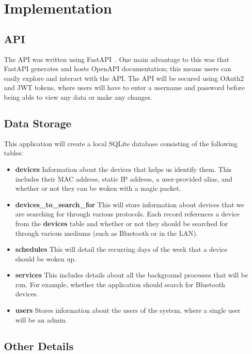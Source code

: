 
\section{Implementation}

\subsection{API}

The API was written using FastAPI~\cite{}. One main advantage to this was that FastAPI generates and hosts OpenAPI documentation; this means users can easily explore and interact with the API.
\x
The API will be secured using OAuth2 and JWT tokens, where users will have to enter a username and password before being able to view any data or make any changes.

\subsection{Data Storage}

This application will create a local SQLite database consisting of the following tables:

\begin{itemize}[noitemsep]
  \item \textbf{devices} Information about the devices that helps us identify them. This includes their MAC address, static IP address, a user-provided alias, and whether or not they can be woken with a magic packet.
  \item \textbf{devices\_to\_search\_for} This will store information about devices that we are searching for through various protocols. Each record references a device from the \textbf{devices} table and whether or not they should be searched for through various mediums (such as Bluetooth or in the LAN).
  \item \textbf{schedules} This will detail the recurring days of the week that a device should be woken up.
  \item \textbf{services} This includes details about all the background processes that will be run. For example, whether the application should search for Bluetooth devices.
  \item \textbf{users} Stores information about the users of the system, where a single user will be an admin.
\end{itemize}

\subsection{Other Details}

